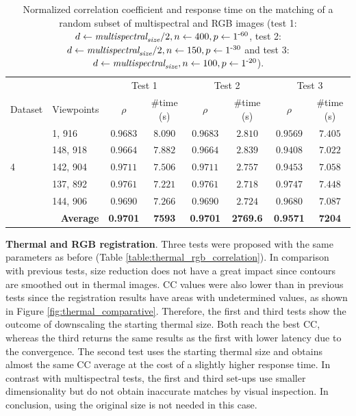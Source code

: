 \renewcommand{\arraystretch}{1.15}
\begin{table}
    \caption{Normalized correlation coefficient and response time on the matching of a random subset of multispectral and RGB images (test 1: $d \gets \textit{multispectral}_{\textit{size}} / 2, n \gets 400, p \gets 1\textsuperscript{-60}$, test 2: $d \gets \textit{multispectral}_{\textit{size}} / 2, n \gets 150, p \gets 1\textsuperscript{-30}$ and test 3: $d \gets \textit{multispectral}_{\textit{size}}, n \gets 100, p \gets 1\textsuperscript{-20}$).}
    \label{table:multispectral_rgb_correlation}
    \begin{tabular}{ll|cc|cc|cc}
        \toprule
        \multicolumn{2}{c}{} & \multicolumn{2}{c}{Test 1} & \multicolumn{2}{c}{Test 2} & \multicolumn{2}{c}{Test 3}\\
        \cmidrule{1-8}
        Dataset & Viewpoints & $\rho$ & \#time (\si{\second}) & $\rho$ & \#time (\si{\second}) & $\rho$ & \#time (\si{\second})\\
        \cmidrule{1-8}
        \multirow{5}{*}{4} & 1, 916 & $0.9683$ & $8.090$ & $0.9683$ & $2.810$ & $0.9569$ & $7.405$\\
        & 148, 918 & $0.9664$ & $7.882$ & $0.9664$ & $2.839$ & $0.9408$ & $7.022$\\
        & 142, 904 & $0.9711$ & $7.506$ & $0.9711$ & $2.757$ & $0.9453$ & $7.058$\\ 
        & 137, 892 & $0.9761$ & $7.221$ & $0.9761$ & $2.718$ & $0.9747$ & $7.448$\\
        & 144, 906 & $0.9690$ & $7.266$ & $0.9690$ & $2.724$ & $0.9680$ & $7.087$\\
        \cmidrule{1-8}
        \multicolumn{2}{r|}{\textbf{Average}} & \textbf{0.9701} & \textbf{7593} & \textbf{0.9701} & \textbf{2769.6} & \textbf{0.9571} & \textbf{7204}\\
        \bottomrule
    \end{tabular}
\end{table}
\renewcommand{\arraystretch}{1}

\textbf{Thermal and RGB registration}. Three tests were proposed with the same parameters as before (Table \ref{table:thermal_rgb_correlation}). In comparison with previous tests, size reduction does not have a great impact since contours are smoothed out in thermal images. CC values were also lower than in previous tests since the registration results have areas with undetermined values, as shown in Figure \ref{fig:thermal_comparative}. Therefore, the first and third tests show the outcome of downscaling the starting thermal size. Both reach the best CC, whereas the third returns the same results as the first with lower latency due to the convergence. The second test uses the starting thermal size and obtains almost the same CC average at the cost of a slightly higher response time. In contrast with multispectral tests, the first and third set-ups use smaller dimensionality but do not obtain inaccurate matches by visual inspection. In conclusion, using the original size is not needed in this case. 

